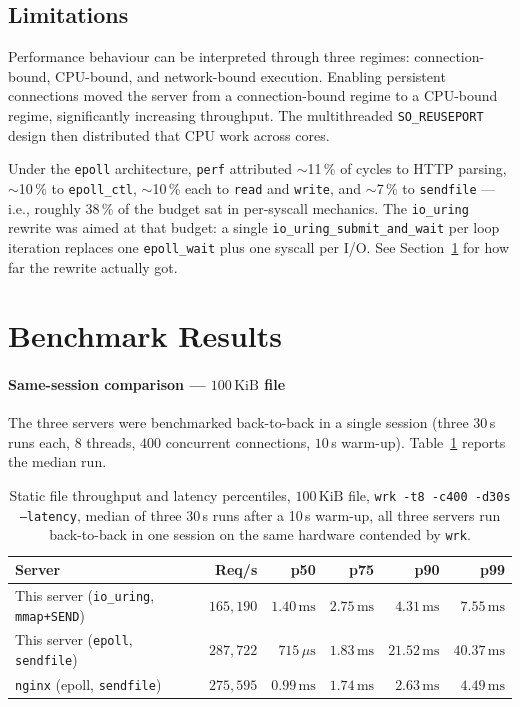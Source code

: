 \documentclass{article}
\begin{document}
\subsection{Limitations}

Performance behaviour can be interpreted through three regimes: connection-bound, CPU-bound,
and network-bound execution. Enabling persistent connections moved the server from a
connection-bound regime to a CPU-bound regime, significantly increasing throughput. The
multithreaded \texttt{SO\_REUSEPORT} design then distributed that CPU work across cores.

Under the \texttt{epoll} architecture, \texttt{perf} attributed $\sim$11\,\% of cycles to
HTTP parsing, $\sim$10\,\% to \texttt{epoll\_ctl}, $\sim$10\,\% each to \texttt{read} and
\texttt{write}, and $\sim$7\,\% to \texttt{sendfile} --- i.e., roughly $38\,\%$ of the
budget sat in per-syscall mechanics. The \texttt{io\_uring} rewrite was aimed at that
budget: a single \texttt{io\_uring\_submit\_and\_wait} per loop iteration replaces one
\texttt{epoll\_wait} plus one syscall per I/O. See Section~\ref{sec:bench} for how far
the rewrite actually got.

\section{Benchmark Results}
\label{sec:bench}

\paragraph{Same-session comparison --- $100\,\mathrm{KiB}$ file}
The three servers were benchmarked back-to-back in a single session (three 30\,s runs
each, $8$ threads, $400$ concurrent connections, $10$\,s warm-up). Table~\ref{tab:bench}
reports the median run.

\begin{table}[h]
\centering
\begin{tabular}{lrrrrr}
\toprule
\textbf{Server} & \textbf{Req/s} & \textbf{p50} & \textbf{p75} & \textbf{p90} & \textbf{p99} \\
\midrule
This server (\texttt{io\_uring}, \texttt{mmap+SEND}) & $165{,}190$ & $1.40\,\mathrm{ms}$ & $2.75\,\mathrm{ms}$ & $4.31\,\mathrm{ms}$ & $7.55\,\mathrm{ms}$ \\
This server (\texttt{epoll}, \texttt{sendfile})       & $287{,}722$ & $715\,\mu\mathrm{s}$   & $1.83\,\mathrm{ms}$ & $21.52\,\mathrm{ms}$ & $40.37\,\mathrm{ms}$ \\
\texttt{nginx} (epoll, \texttt{sendfile})             & $275{,}595$ & $0.99\,\mathrm{ms}$ & $1.74\,\mathrm{ms}$ & $2.63\,\mathrm{ms}$ & $4.49\,\mathrm{ms}$ \\
\bottomrule
\end{tabular}
\caption{Static file throughput and latency percentiles, $100\,\mathrm{KiB}$ file,
\texttt{wrk -t8 -c400 -d30s --latency}, median of three 30\,s runs after a 10\,s
warm-up, all three servers run back-to-back in one session on the same hardware
contended by \texttt{wrk}.}
\label{tab:bench}
\end{table}
\end{document}
